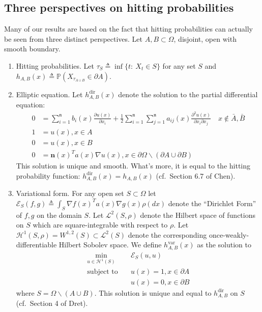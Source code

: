 \documentclass[english, aip, jcp, priprint, graphicx,floatfix]{revtex4-1}
\theoremstyle{plain}
\theoremstyle{definition}
\theoremstyle{plain}
\newcommand{\dimension}{{\mathfrak{n}}}
\begin{document}
\subsection{Three perspectives on hitting probabilities}

Many of our results are based on the fact that hitting probabilities can actually be seen from three distinct perspectives.  Let $A,B\subset \Omega$, disjoint, open with smooth boundary.  

\begin{enumerate}
    \item Hitting probabilities.  Let $\tau_S \triangleq \inf\{t:\ X_t \in S\}$ for any set $S$ and $h_{A,B}(x) \triangleq \mathbb{P}(X_{\tau_{A\cup B}}\in \partial A)$.
    
    \item Elliptic equation.  Let $h^\mathrm{dir}_{A,B}(x)$ denote the solution to the partial differential equation:
	    \begin{align}\label{eq:pde}
    0 &= \sum_{i = 1}^\dimension b_i (x) \frac{\partial u
        (x)}{\partial x_i} + \frac{1}{2} \sum_{i = 1}^\dimension \sum_{j = 1}^\dimension a_{ij} (x)
        \frac{\partial^2 u (x)}{\partial x_i \partial x_j}\quad x\notin \bar A,\bar B\\
    1 &= u(x),x\in A \nonumber \\ 
    0 &= u(x) ,x\in B \nonumber \\
    0 &= \mathbf{n}(x)^Ta(x)\nabla u(x), x \in \partial{\Omega} \backslash (\partial A \cup \partial B) \nonumber
    \end{align}
    This solution is unique and smooth.\cite{lieberman1986mixed}  What's more, it is equal to the hitting probability function: $h^\mathrm{dir}_{A,B}(x)=h_{A,B}(x)$ (cf.\ Section 6.7 of Chen\cite{chen2012symmetric}).

    \item Variational form.  For any open set $S\subset \Omega$ let $\mathscr{E}_{S}(f,g)\triangleq \int_S \nabla f(x)^T a(x) \nabla g(x) \rho(dx)$ denote the ``Dirichlet Form'' of $f,g$ on the domain $S$.  Let $\mathscr L^2(S,\rho)$ denote the Hilbert space of functions on $S$ which are square-integrable with respect to $\rho$.  Let $\mathcal{H}^1(S,\rho)=W^{1,2}(S) \subset \mathscr{L}^2(S)$ denote the corresponding once-weakly-differentiable Hilbert Sobolev space.  We define $h^\mathrm{var}_{A,B}(x)$ as the solution to 
    \begin{align*}
    \min_{u \in \mathcal H^1(S)} \quad & \mathscr{E}_S(u,u) \\
    \mbox{subject to} \quad & u(x)=1,x\in \partial A \\
     & u(x)=0,x\in \partial B
    \end{align*}
    where $S=\Omega \backslash (A\cup B)$.  This solution is unique and equal to $h^\mathrm{dir}_{A,B}$ on $S$ (cf.\ Section 4 of Dret\cite{dret2016partial}).  


\end{enumerate}
\end{document}
